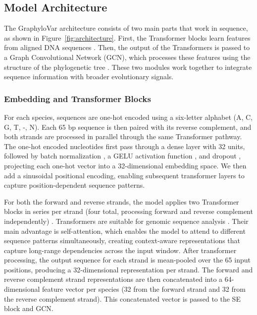 \documentclass[unnumsec,webpdf,contemporary,large]{oup-authoring-template}%
\newcommand{\rev}[1]{{\color{red}#1}}
\theoremstyle{thmstyleone}%
\theoremstyle{thmstyletwo}%
\theoremstyle{thmstylethree}%
\begin{document}
\subsection{Model Architecture}

The GraphyloVar architecture consists of two main parts that work in sequence, as shown in Figure~\ref{fig:architecture}. First, the Transformer blocks learn features from aligned DNA sequences \citep{NIPS2017_3f5ee243}. Then, the output of the Transformers is passed to a Graph Convolutional Network (GCN), which processes these features using the structure of the phylogenetic tree \citep{kipf2016semi}. These two modules work together to integrate sequence information with broader evolutionary signals.

\subsubsection{Embedding and Transformer Blocks}
For each species, sequences are one-hot encoded using a six-letter alphabet (A, C, G, T, -, N). Each 65 bp sequence is then paired with its reverse complement, and both strands are processed in parallel through the same Transformer pathway.
The one-hot encoded nucleotides first pass through a dense layer with 32 units, followed by batch normalization \citep{batch10.5555/3045118.3045167}, a GELU activation function \citep{GeluHendrycks2016}, and dropout \citep{dropout10.5555/2627435.2670313}, projecting each one-hot vector into a 32-dimensional embedding space. We then add a sinusoidal positional encoding, enabling subsequent transformer layers to capture position-dependent sequence patterns.

For both the forward and reverse strands, the model applies two Transformer blocks in series per strand (four total, processing forward and reverse complement independently) \citep{NIPS2017_3f5ee243}. Transformers are suitable for genomic sequence analysis \citep{ji2021dnabert, benegas2024gpnmsa}. Their main advantage is self-attention, which enables the model to attend to different sequence patterns simultaneously, creating context-aware representations that capture long-range dependencies across the input window.
After transformer processing, \rev{the output sequence for each strand is mean-pooled over the 65 input positions, producing a 32-dimensional representation per strand. The forward and reverse complement strand representations are then concatenated into a 64-dimensional feature vector per species (32 from the forward strand and 32 from the reverse complement strand). This concatenated vector is passed to the SE block and GCN.}
\end{document}
